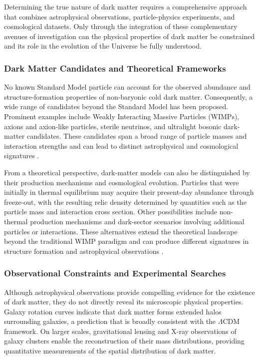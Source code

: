 Determining the true nature of dark matter requires a comprehensive approach that combines astrophysical observations, particle-physics experiments, and cosmological datasets. Only through the integration of these complementary avenues of investigation can the physical properties of dark matter be constrained and its role in the evolution of the Universe be fully understood.

\subsubsection{Dark Matter Candidates and Theoretical Frameworks}

No known Standard Model particle can account for the observed abundance and
structure-formation properties of non-baryonic cold dark matter. Consequently,
a wide range of candidates beyond the Standard Model has been proposed.
Prominent examples include Weakly Interacting Massive Particles (WIMPs),
axions and axion-like particles, sterile neutrinos, and ultralight bosonic
dark-matter candidates. These candidates span a broad range of particle masses
and interaction strengths and can lead to distinct astrophysical and
cosmological signatures \cite{baudis2024}.

From a theoretical perspective, dark-matter models can also be distinguished
by their production mechanisms and cosmological evolution. Particles that were
initially in thermal equilibrium may acquire their present-day abundance
through freeze-out, with the resulting relic density determined by quantities
such as the particle mass and interaction cross section. Other possibilities
include non-thermal production mechanisms and dark-sector scenarios involving
additional particles or interactions. These alternatives extend the theoretical
landscape beyond the traditional WIMP paradigm and can produce different
signatures in structure formation and astrophysical observations
\cite{baudis2024}.

\subsubsection{Observational Constraints and Experimental Searches}

Although astrophysical observations provide compelling evidence for the existence of dark matter, they do not directly reveal its microscopic physical properties. Galaxy rotation curves indicate that dark matter forms extended halos surrounding galaxies, a prediction that is broadly consistent with the $\Lambda$CDM framework. On larger scales, gravitational lensing and X-ray observations of galaxy clusters enable the reconstruction of their mass distributions, providing quantitative measurements of the spatial distribution of dark matter.

